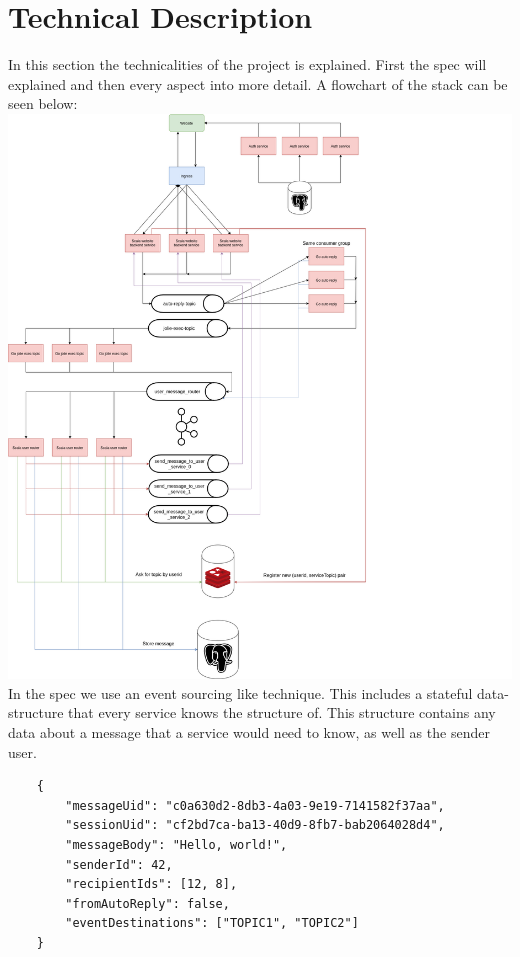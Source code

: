 
\section{Technical Description}\label{sec:technicalDescription}
In this section the technicalities of the project is explained.
First the spec will explained and then every aspect into more detail.
A flowchart of the stack can be seen below:\\
\includegraphics[scale=0.38]{stack.png}
\\
In the spec we use an event sourcing like technique.\cite{fowlerEventSourcing}
This includes a stateful data-structure that every service knows the structure of.
This structure contains any data about a message that a service would need to know, as well as the sender user.\\
\begin{lstlisting}
    {
        "messageUid": "c0a630d2-8db3-4a03-9e19-7141582f37aa",
        "sessionUid": "cf2bd7ca-ba13-40d9-8fb7-bab2064028d4",
        "messageBody": "Hello, world!",
        "senderId": 42,
        "recipientIds": [12, 8],
        "fromAutoReply": false,
        "eventDestinations": ["TOPIC1", "TOPIC2"]
    }
\end{lstlisting}
